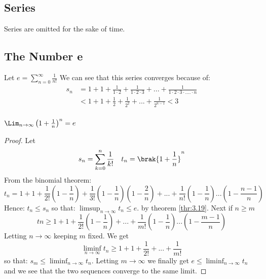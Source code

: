 \documentclass[12pt, letterpaper]{paper}
\begin{document}
\subsection*{Series}

Series are omitted for the sake of time.

\subsection*{The Number e}

Let $e = \sum_{n=0}^{\infty} \frac{1}{n!}$ We can see that this series
converges because of:
\begin{align*}
  s_n &= 1 + 1 + \frac{1}{1 \cdot 2} + \frac{1}{1 \cdot 2 \cdot 3} + ... +
        \frac{1}{1 \cdot2 \cdot 3 \cdot .... \cdot n}\\
      &< 1 + 1 + \frac{1}{2} + \frac{1}{2^2} + ... + \frac{1}{2^{n-1}} < 3\\
\end{align*}

\begin{theorem}
  \label{thr:31}
  $\Lim_{n\to\infty} \left ( 1 + \frac{1}{n} \right )^n = e$
\end{theorem}
\begin{proof}
  Let
  \begin{equation*}
    s_n = \sum_{k=0}^n \frac{1}{k!} \quad t_n = \brak{ 1 + \frac{1}{n}}^n
  \end{equation*}
  From the binomial theorem:
  \begin{equation*}
    t_n = 1 + 1 + \frac{1}{2!}( 1 - \frac{1}{n} ) + \frac{1}{3!}( 1 -
    \frac{1}{n} )( 1 - \frac{2}{n}) + ... + \frac{1}{n!}( 1 -
    \frac{1}{n})...(1 - \frac{n-1}{n})
  \end{equation*}
  Hence: $t_n \leq s_n$ so that: $\limsup_{n\to\infty}t_n \leq e$. by
  theorem \ref{thr:3.19}. Next if $n \geq m$
  \begin{equation*}
    tn \geq 1 + 1 + \frac{1}{2!}( 1 - \frac{1}{n} ) + ... +
    \frac{1}{m!}(1-\frac{1}{n})...(1 - \frac{m-1}{n} )
  \end{equation*}
  Letting $n \to \infty$ keeping $m$ fixed. We get
  \begin{equation*}
    \liminf_{n\to\infty}t_n \geq 1 + 1 + \frac{1}{2!} + ... + \frac{1}{m!}
  \end{equation*}
  so that: $s_m \leq \liminf_{n\to\infty} t_n$. Letting $m \to \infty$
  we finally get $e \leq \liminf_{n\to\infty} t_n$ and we see that the
  two sequences converge to the same limit.
\end{proof}
\end{document}
